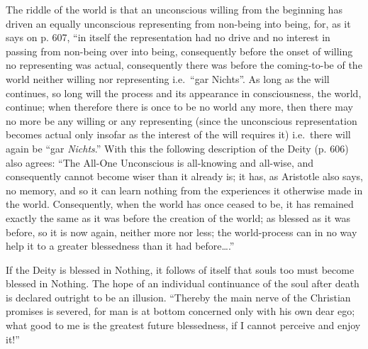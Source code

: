 \documentclass[12pt,a4paper,openany]{book}
\newcommand{\opage}[1]{\marginnote{\footnotesize\textit{[#1]}}}
\begin{document}
The riddle of the world is that an unconscious willing from the beginning
has driven an equally unconscious representing from
non-being into being, for, as it says on p. 607, ``in itself
the representation had no drive and no interest in
passing from non-being over into being, consequently before the onset
of willing no representing was actual, consequently there was
before the coming-to-be of the world neither willing nor representing
i.e.\ ``gar Nichts''. As long as the will continues, so long
will the process and its appearance in consciousness,
the world, continue; when therefore there is once to be
no world any more, then there may no more be
any willing or any representing (since the unconscious
representation becomes actual only insofar as the interest
of the will requires it) i.e.\ there will again be ``gar
\emph{Nichts}.'' With this the following description
of the Deity (p. 606) also agrees: ``The All-One Unconscious
is all-knowing and all-wise, and consequently cannot become wiser
than it already is; it has, as Aristotle also says,
no memory, and so it can learn nothing from the experiences it
otherwise made in the world. Consequently, when
the world has once ceased to be, it has remained exactly
the same as it was before the creation of the world; as blessed
as it was before, so it is now again, neither more nor
less; the world-process can in no way help
it to a greater blessedness than it had before\dots{}.''

If the Deity is blessed in Nothing, it follows of
\setcounter{footnote}{0}%
\opage{14}itself that souls too must become blessed in Nothing. The hope
of an individual continuance of the soul after death is declared
outright to be an illusion. ``Thereby the main nerve of the Christian
promises is severed, for man is at bottom
concerned only with his own dear ego;
what good to me is the greatest future blessedness, if
I cannot perceive and enjoy it!''
\end{document}
